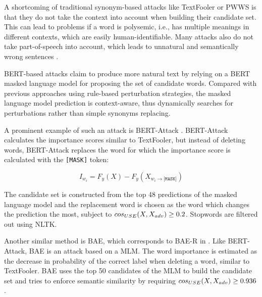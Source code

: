 A shortcoming of traditional synonym-based attacks like TextFooler or PWWS
is that they do not take the context into account when building their candidate
set. This can lead to problems if a word is polysemic, i.e., has multiple meanings
in different contexts, which are easily human-identifiable. 
Many attacks also do not take part-of-speech into account,
which leads to unnatural and semantically wrong sentences \cite{https://doi.org/10.48550/arxiv.2109.07403}.

BERT-based attacks
claim to produce more natural text by relying on a BERT masked language model for proposing the set of candidate words. 
Compared with previous approaches using rule-based perturbation strategies, the masked language model prediction is context-aware, thus dynamically searches for perturbations rather than simple synonyms replacing.

A prominent example of such
an attack is BERT-Attack \cite{conf/emnlp/LiMGXQ20}. BERT-Attack calculates the importance scores
similar to TextFooler, but instead of deleting words, BERT-Attack replaces the
word for which the importance score is calculated with the \texttt{[MASK]} token:

\begin{equation}
  I_{w_i} = F_y(X) - F_y(X_{w_i \rightarrow \texttt{[MASK]}})
\end{equation}

The candidate set
is constructed from the top 48 predictions of the masked
language model and the replacement word is chosen as the word which changes
the prediction the most, subject to $cos_{\tiny{USE}}(X, X_{adv}
) \geq 0.2$. Stopwords are filtered out
using NLTK.

Another similar method is BAE, which corresponds to BAE-R in \cite{conf/emnlp/GargR20}. 
Like BERT-Attack, BAE is an attack
based on a MLM. The word importance is estimated as the decrease in probability
of the correct label when deleting a word, similar to TextFooler. BAE uses the
top 50 candidates of the MLM to build the candidate set and tries to enforce
semantic similarity by requiring $cos_{\tiny{USE}}(X, X_{adv}
) \geq 0.936$.

